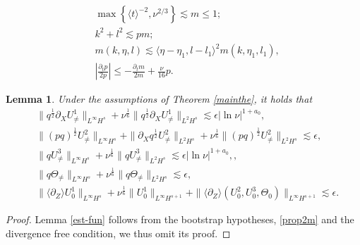 \documentclass[10pt,a4paper]{amsart}
\newtheorem{lemma}{Lemma}
\def\red#1{\textcolor{red}{#1}}
\newcommand{\wtb}{\langle\partial_Z\rangle }
\begin{document}
			\begin{align}
			&\max\left\{\langle t\rangle^{-2},\nu^{2/3}\right\}\lesssim m\leq 1;\label{prop1m}\\
			& k^2+l^2\lesssim p m;\label{prop2m}\\
			& m(k,\eta,l)\lesssim \langle\eta-\eta_1,l-l_1\rangle^2m(k,\eta_1,l_1),\label{prop3m} \\
            & \left|\frac{\partial_t p}{2p}\right| \leqslant -\frac{\partial_t m}{2m} + \frac{\nu}{16} p. 
		\end{align}

    \begin{lemma}\label{est-fun}
        Under the assumptions of Theorem \ref{mainthe}, it holds that
        \begin{align*}
        &\|q^{\frac{1}{2}}\partial_X U^1_{\neq}\|_{L^\infty H^s}+\nu^{\frac{1}{6}}\|q^{\frac{1}{2}}\partial_X U^1_{\neq}\|_{L^2 H^s}\lesssim\epsilon|\ln{\nu} |^{1+a_0},\\
		&\|(pq)^{\frac{1}{2}}U^2_{\neq}\|_{L^\infty H^s}+\|\partial_Xq^{\frac{1}{2}}U^2_{\neq}\|_{L^2 H^s}+\nu^{\frac{1}{6}}\|(pq)^{\frac{1}{2}}U^2_{\neq}\|_{L^2 H^s}\lesssim\epsilon,\\
		&\|q U^3_{\neq}\|_{L^\infty H^s}+\nu^{\frac{1}{6}}\|q U^3_{\neq}\|_{L^2 H^s}\lesssim\epsilon|\ln{\nu} |^{1+a_0},,\\
		&\|q\Theta_{\neq}\|_{L^\infty H^s}+\nu^{\frac{1}{6}}\|q\Theta_{\neq}\|_{L^2H^s}\lesssim\epsilon,\\
		&\|\wtb U^1_{0}\|_{L^\infty H^s}+\nu^{\frac{1}{6}}\|U^1_{0}\| _{L^\infty H^{s+1}}+\|\wtb (U^2_{0},U_0^3,\Theta_0) \|_{L^\infty H^{s+1}} \lesssim\epsilon.
	\end{align*}
    \end{lemma}

    \begin{proof}
        Lemma \eqref{est-fun} follows from the bootstrap hypotheses, \eqref{prop2m} and the divergence free condition, we thus omit its proof. 
    \end{proof}
\end{document}
